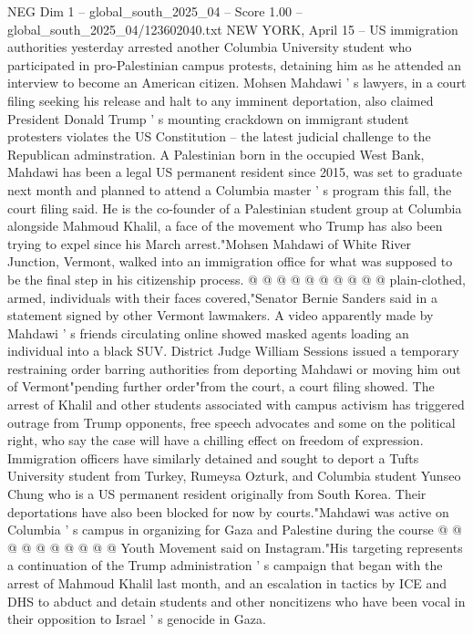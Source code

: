 \begin{textsample}{NEG Dim 1 – global\_south\_2025\_04 – Score 1.00 – global\_south\_2025\_04/123602040.txt}  \label{ex:f1_neg_159}
NEW YORK, April 15 -- US immigration authorities yesterday arrested another Columbia University student who participated in pro-Palestinian campus protests, detaining him as he attended an interview to become an American citizen.
Mohsen Mahdawi ' s lawyers, in a court filing seeking his release and halt to any imminent deportation, also claimed President Donald Trump ' s mounting crackdown on immigrant student protesters violates the US Constitution -- the latest judicial challenge to the Republican adminstration.
A Palestinian born in the occupied West Bank, Mahdawi has been a legal US permanent resident since 2015, was set to graduate next month and planned to attend a Columbia master ' s program this fall, the court filing said.
He is the co-founder of a Palestinian student group at Columbia alongside Mahmoud Khalil, a face of the movement who Trump has also been trying to expel since his March arrest."Mohsen Mahdawi of White River Junction, Vermont, walked into an immigration office for what was supposed to be the final step in his citizenship process. @ @ @ @ @ @ @ @ @ @ plain-clothed, armed, individuals with their faces covered,"Senator Bernie Sanders said in a statement signed by other Vermont lawmakers.
A video apparently made by Mahdawi ' s friends circulating online showed masked agents loading an individual into a black SUV.
District Judge William Sessions issued a temporary restraining order barring authorities from deporting Mahdawi or moving him out of Vermont"pending further order"from the court, a court filing showed.
The arrest of Khalil and other students associated with campus activism has triggered outrage from Trump opponents, free speech advocates and some on the political right, who say the case will have a chilling effect on freedom of expression.
Immigration officers have similarly detained and sought to deport a Tufts University student from Turkey, Rumeysa Ozturk, and Columbia student Yunseo Chung who is a US permanent resident originally from South Korea.
Their deportations have also been blocked for now by courts."Mahdawi was active on Columbia ' s campus in organizing for Gaza and Palestine during the course @ @ @ @ @ @ @ @ @ @ Youth Movement said on Instagram."His targeting represents a continuation of the Trump administration ' s campaign that began with the arrest of Mahmoud Khalil last month, and an escalation in tactics by ICE and DHS to abduct and detain students and other noncitizens who have been vocal in their opposition to Israel ' s genocide in Gaza.

\end{textsample}
